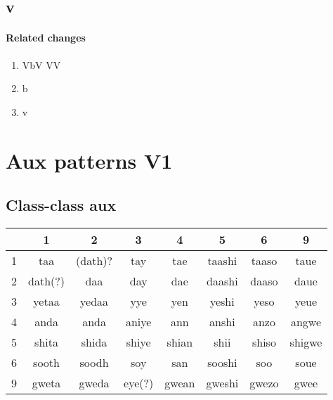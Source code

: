 \documentclass[11pt]{article}
\begin{document}
\subsection{v}
\paragraph{Related changes}
\begin{enumerate}
\item VbV \textrightarrow VV
\item b \textrightarrow {}
\item {} \textrightarrow v
\end{enumerate}

\section{Aux patterns V1}
\subsection{Class-class aux}

\begin{center}
	\begin{tabular}{|l|c|c|c|c|c|c|c|}
	\hline
	& 1 & 2 & 3 & 4 & 5 & 6 & 9 \\ \hline
	1 & taa & (dath)? & tay & tae & taashi & taaso & taue \\ \hline
	2 & dath(?) & daa & day & dae & daashi & daaso & daue \\ \hline
	3 & yetaa & yedaa & yye & yen & yeshi & yeso & yeue \\ \hline
	4 & anda & anda & aniye & ann & anshi & anzo & angwe \\ \hline
	5 & shita & shida & shiye & shian & shii & shiso & shigwe \\ \hline
    6 & sooth & soodh & soy & san & sooshi & soo & soue \\ \hline
    9 & gweta & gweda & eye(?) & gwean & gweshi & gwezo & gwee \\ \hline
	\end{tabular}
\end{center}
\end{document}
